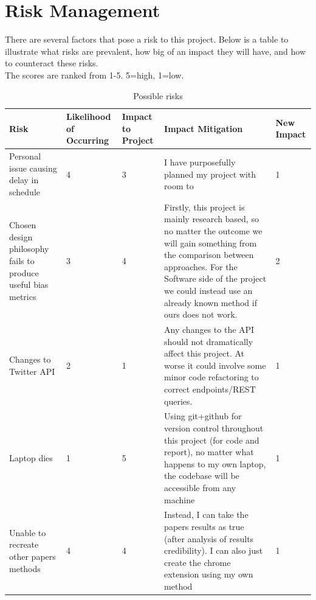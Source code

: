 \documentclass[a4paper,fleqn,10pt]{article}
\begin{document}
\section{Risk Management}
\label{sec:risk}
There are several factors that pose a risk to this project. Below is a table to illustrate what risks are prevalent, how big of an impact they will have, and how to counteract these risks.\\
The scores are ranked from 1-5. 5=high, 1=low.\\
\newpage
\begin{table}[htbp]
    \begin{tabular}{|p{25mm}|p{20mm}|p{13mm}|p{55mm}|p{14mm}|}
    \hline
        Risk & Likelihood of Occurring & Impact to Project & Impact Mitigation & New Impact \\
        \hline
        Personal issue causing delay in schedule & 4 & 3 & I have purposefully planned my project with room to & 1 \\
        \hline
        Chosen design philosophy fails to produce useful bias metrics & 3 & 4 & Firstly, this project is mainly research based, so no matter the outcome we will gain something from the comparison between approaches. For the Software side of the project we could instead use an already known method if ours does not work. & 2 \\
        \hline
        Changes to Twitter API & 2 & 1 & Any changes to the API should not dramatically affect this project. At worse it could involve some minor code refactoring to correct endpoints/REST queries. & 1\\
        \hline
        Laptop dies & 1 & 5 & Using git+github for version control throughout this project (for code and report), no matter what happens to my own laptop, the codebase will be accessible from any machine & 1\\
        \hline
        Unable to recreate other papers methods & 4 & 4 & Instead, I can take the papers results as true (after analysis of results credibility). I can also just create the chrome extension using my own method & 1\\
        \hline
    \end{tabular}
    \caption{Possible risks}
    \label{tab:risk}
\end{table}

\newpage


\end{document}
